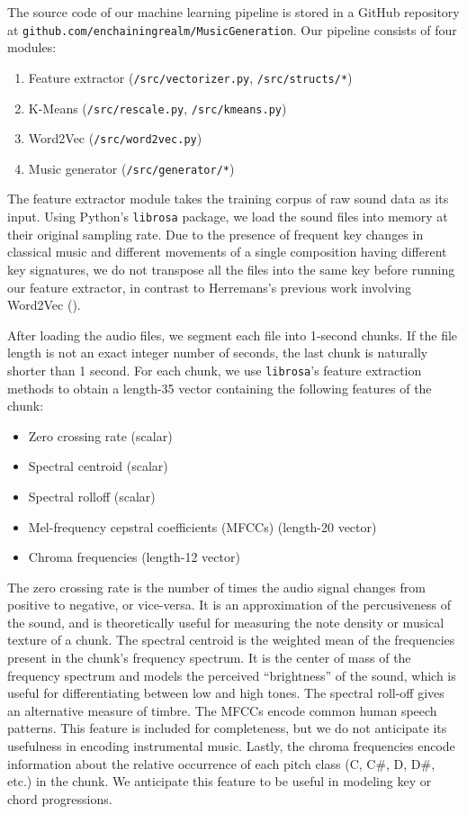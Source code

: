 \documentclass{article}
\begin{document}
The source code of our machine learning pipeline is stored in a GitHub repository at \texttt{github.com/enchainingrealm/MusicGeneration}. Our pipeline consists of four modules:

\begin{enumerate}
    \item Feature extractor (\texttt{/src/vectorizer.py}, \texttt{/src/structs/*})
    \item K-Means (\texttt{/src/rescale.py}, \texttt{/src/kmeans.py})
    \item Word2Vec (\texttt{/src/word2vec.py})
    \item Music generator (\texttt{/src/generator/*})
\end{enumerate}

The feature extractor module takes the training corpus of raw sound data as its input. Using Python's \texttt{librosa} package, we load the sound files into memory at their original sampling rate. Due to the presence of frequent key changes in classical music and different movements of a single composition having different key signatures, we do not transpose all the files into the same key before running our feature extractor, in contrast to Herremans's previous work involving Word2Vec (\cite{modeling_musical_context_with}).

After loading the audio files, we segment each file into 1-second chunks. If the file length is not an exact integer number of seconds, the last chunk is naturally shorter than 1 second. For each chunk, we use \texttt{librosa}'s feature extraction methods to obtain a length-35 vector containing the following features of the chunk:

\begin{itemize}
    \item Zero crossing rate (scalar)
    \item Spectral centroid (scalar)
    \item Spectral rolloff (scalar)
    \item Mel-frequency cepstral coefficients (MFCCs) (length-20 vector)
    \item Chroma frequencies (length-12 vector)
\end{itemize}

The zero crossing rate is the number of times the audio signal changes from positive to negative, or vice-versa. It is an approximation of the percusiveness of the sound, and is theoretically useful for measuring the note density or musical texture of a chunk. The spectral centroid is the weighted mean of the frequencies present in the chunk's frequency spectrum. It is the center of mass of the frequency spectrum and models the perceived ``brightness'' of the sound, which is useful for differentiating between low and high tones. The spectral roll-off gives an alternative measure of timbre. The MFCCs encode common human speech patterns. This feature is included for completeness, but we do not anticipate its usefulness in encoding instrumental music. Lastly, the chroma frequencies encode information about the relative occurrence of each pitch class (C, C\#, D, D\#, etc.) in the chunk. We anticipate this feature to be useful in modeling key or chord progressions.
\end{document}
